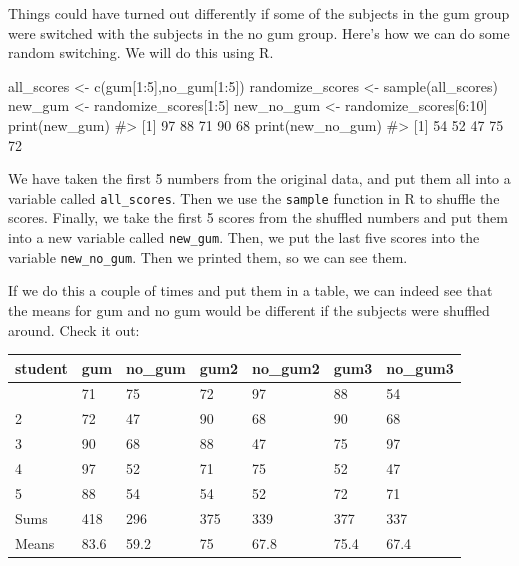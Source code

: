 \documentclass[
  letterpaper,
  DIV=11,
  numbers=noendperiod]{scrreprt}
\newenvironment{Shaded}{\begin{snugshade}}{\end{snugshade}}
\newcommand{\CommentTok}[1]{\textcolor[rgb]{0.37,0.37,0.37}{#1}}
\newcommand{\DecValTok}[1]{\textcolor[rgb]{0.68,0.00,0.00}{#1}}
\newcommand{\FunctionTok}[1]{\textcolor[rgb]{0.28,0.35,0.67}{#1}}
\newcommand{\NormalTok}[1]{\textcolor[rgb]{0.00,0.23,0.31}{#1}}
\newcommand{\OtherTok}[1]{\textcolor[rgb]{0.00,0.23,0.31}{#1}}
\newcommand{\SpecialCharTok}[1]{\textcolor[rgb]{0.37,0.37,0.37}{#1}}
\begin{document}
Things could have turned out differently if some of the subjects in the
gum group were switched with the subjects in the no gum group. Here's
how we can do some random switching. We will do this using R.

\begin{Shaded}
\begin{Highlighting}[]
\NormalTok{all\_scores       }\OtherTok{\textless{}{-}} \FunctionTok{c}\NormalTok{(gum[}\DecValTok{1}\SpecialCharTok{:}\DecValTok{5}\NormalTok{],no\_gum[}\DecValTok{1}\SpecialCharTok{:}\DecValTok{5}\NormalTok{])}
\NormalTok{randomize\_scores }\OtherTok{\textless{}{-}} \FunctionTok{sample}\NormalTok{(all\_scores)}
\NormalTok{new\_gum          }\OtherTok{\textless{}{-}}\NormalTok{ randomize\_scores[}\DecValTok{1}\SpecialCharTok{:}\DecValTok{5}\NormalTok{]}
\NormalTok{new\_no\_gum       }\OtherTok{\textless{}{-}}\NormalTok{ randomize\_scores[}\DecValTok{6}\SpecialCharTok{:}\DecValTok{10}\NormalTok{]}
\FunctionTok{print}\NormalTok{(new\_gum)}
\CommentTok{\#\textgreater{} [1] 97 88 71 90 68}
\FunctionTok{print}\NormalTok{(new\_no\_gum)}
\CommentTok{\#\textgreater{} [1] 54 52 47 75 72}
\end{Highlighting}
\end{Shaded}

We have taken the first 5 numbers from the original data, and put them
all into a variable called \texttt{all\_scores}. Then we use the
\texttt{sample} function in R to shuffle the scores. Finally, we take
the first 5 scores from the shuffled numbers and put them into a new
variable called \texttt{new\_gum}. Then, we put the last five scores
into the variable \texttt{new\_no\_gum}. Then we printed them, so we can
see them.

If we do this a couple of times and put them in a table, we can indeed
see that the means for gum and no gum would be different if the subjects
were shuffled around. Check it out:

\begin{longtable}[]{@{}lllllll@{}}
\toprule\noalign{}
student & gum & no\_gum & gum2 & no\_gum2 & gum3 & no\_gum3 \\
\midrule\noalign{}
\endhead
\bottomrule\noalign{}
\endlastfoot
1 & 71 & 75 & 72 & 97 & 88 & 54 \\
2 & 72 & 47 & 90 & 68 & 90 & 68 \\
3 & 90 & 68 & 88 & 47 & 75 & 97 \\
4 & 97 & 52 & 71 & 75 & 52 & 47 \\
5 & 88 & 54 & 54 & 52 & 72 & 71 \\
Sums & 418 & 296 & 375 & 339 & 377 & 337 \\
Means & 83.6 & 59.2 & 75 & 67.8 & 75.4 & 67.4 \\
\end{longtable}
\end{document}
